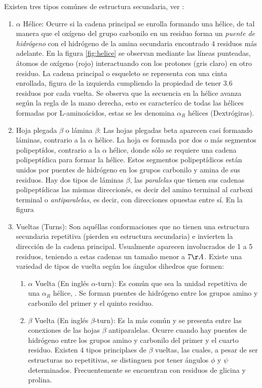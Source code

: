 Existen tres tipos com\'{u}nes de estructura secundaria, ver \cite{Kuchel}:
\begin{enumerate}
 \item $\alpha$ H\'{e}lice: Ocurre si la cadena principal se enrolla formando una h\'{e}lice, de tal manera que el ox\'{i}geno del grupo carbonilo en un residuo forma un \textit{puente de hidr\'{o}geno} con el hidr\'{o}geno de la amina secundaria encontrado 4 residuos m\'{a}s adelante. En la figura \ref{fig:helice} se observan mediante las l\'{i}neas punteadas, \'{a}tomos de ox\'{i}geno (rojo) interactuando con los protones (gris claro)  en otro residuo. La cadena principal o esqueleto se representa con una cinta enrollada, figura de la izquierda cumpliendo la propiedad de tener 3.6 residuos por cada vuelta. Se observa que la secuencia en la h\'{e}lice avanza seg\'{u}n la regla de la mano derecha, esto es caracter\'{i}co de todas las h\'{e}lices formadas por L-amino\'{a}cidos, estas se les denomina $\alpha_R$ h\'{e}lices (Dextr\'{o}giras).
 \item Hoja plegada $\beta$ o l\'{a}mina $\beta$: Las hojas plegadas beta aparecen casi formando l\'{a}minas, contrario a la $\alpha$ h\'{e}lice. La hoja es formada por dos o m\'{a}s segmentos polipept\'{i}dos, contrario a la $\alpha$ h\'{e}lice, donde s\'{o}lo se requiere una cadena polipept\'{i}dica para formar la h\'{e}lice. Estos segmentos polipept\'{i}dicos est\'{a}n unidos por puentes de hidr\'{o}geno en los grupos carbonilo y amina de sus residuos. Hay dos tipos de l\'{a}minas $\beta$, las \textit{paralelas} que tienen sus cadenas polipept\'{i}dicas las mismas direccion\'{e}s, es decir del amino terminal al carboxi terminal o \textit{antiparalelas}, es decir, con direcciones opuestas entre s\'{i}. En la figura 
 \item Vueltas (Turns): Son aqu\'{e}llas conformaciones que no tienen una estructura secundaria repetitiva (pierden su estructura secundaria) e invierten la direcci\'{o}n de la cadena principal. Usualmente aparecen involucrados de 1 a 5 residuos, teniendo a estas cadenas un tama\~{n}o menor a $7\AA$. Existe una variedad de tipos de vuelta seg\'{u}n los \'{a}ngulos dihedros que formen: \cite{Pavone1996}
 \begin{enumerate}
 \item $\alpha$ Vuelta (En ingl\'{e}s $\alpha$-turn): Es com\'{u}n que sea la unidad repetitiva de una $\alpha_R$ h\'{e}lice, \cite{Pavone1996}. Se forman puentes de hidr\'{o}geno entre los grupos amino y carbonilo del primer y el quinto residuo.
 \item $\beta$ Vuelta (En ingl\'{e}s $\beta$-turn): Es la m\'{a}s com\'{u}n y se presenta entre las conexiones de las hojas $\beta$ antiparalelas. Ocurre cuando hay puentes de hidr\'{o}geno entre los grupos amino y carbonilo del primer y el cuarto residuo. Existen 4 tipos principlaes de $\beta$ vueltas, las cuales, a pesar de ser estructuras no repetitivas, se distinguen por tener \'{a}ngulos $\phi$ y $\psi$ determinados. Frecuentemente se encuentran con residuos de glicina y prolina.

\end{enumerate}
\end{enumerate}
